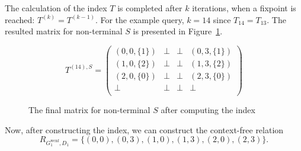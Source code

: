The calculation of the index $T$ is completed after $k$ iterations, when a fixpoint is reached: $T^{(k)} = T^{(k-1)}$. For the example query, $k = 14$ since $T_{14} = T_{13}$. The resulted matrix for non-terminal $S$ is presented in Figure~\ref{ExampleQueryFinalMatrices}.

{\footnotesize
	\begin{figure}[h]
		\[
		T^{(14),S} = \begin{pmatrix}
			(0,0,\{1\}) & \bot       & \bot & (0,3,\{1\})       \\
			(1,0,\{2\}) & \bot & \bot       & (1,3,\{2\}) \\
			(2,0,\{0\})       & \bot & \bot & (2,3,\{0\}) \\
			\bot       & \bot & \bot & \bot \\
		\end{pmatrix}
		\]
		\caption{The final matrix for non-terminal $S$ after computing the index}
		\label{ExampleQueryFinalMatrices}
	\end{figure}
}

Now, after constructing the index, we can construct the context-free relation $$R_{G_1^{\text{wcnf}}, D_1}=\{(0,0),(0,3),(1,0),(1,3),(2,0),(2,3)\}.$$

